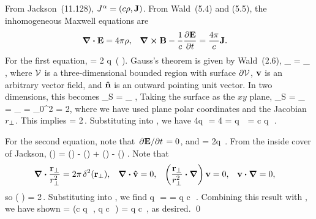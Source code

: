 \begin{solution}
	From Jackson~(11.128), $J^\alpha = (c \rho, \vb{J})$.  From Wald~(5.4) and (5.5), the inhomogeneous Maxwell equations are
	\begin{align} \label{maxwell}
		\grad \vdot \vE &= 4\pi \rho, &
		\grad \cross \vB - \frac{1}{c} \pdv{\vE}{t} &= \frac{4\pi}{c} \vJ.
	\end{align}
\clearpage
	For the first equation,
	\beq
		\grad \vdot \vE = 2 q \,\delctz \left( \grperp \vdot {} \right).
	\eeq
	Gauss's theorem is given by Wald~(2.6),
	\beq
		\int_\cV \grad \vdot \vv {} = \int_{\dcV} \vv \vdot \nh {},
	\eeq
	where $\mathcal{V}$ is a three-dimensional bounded region with surface $\partial \mathcal{V}$, $\vb{v}$ is an arbitrary vector field, and $\vb{\hat{n}}$ is an outward pointing unit vector.  In two dimensions, this becomes
	\beq
		\int_S \grperp \vdot \vv {} = \int_{\dS} \vv \vdot \nh {},
	\eeq
	Taking the surface as the $xy$ plane,
	\beq
		\int_S \grperp \vdot {}  = \int_{\dS}  \vdot \frac{\vrperp}{\rperp} 
		= \int_{\dS} 
		= \int_0^{2\pi} \frac{\rperp}{\rperp} \dd{\tht}
		= 2\pi,
	\eeq
	where we have used plane polar coordinates and the Jacobian $r_\perp$.  This implies
	\beq
		\grperp \vdot {} = 2\pi \,\delrp.
	\eeq
	Substituting into , we have
	\beqn \label{rho}
		4\pi q \,\delrp \,\delctz = 4\pi \rho
		\qimplies
		\rho = q \,\delrp \,\delctz
		\qimplies
		\Jo = c q \,\delrp \,\delctz.
	\eeqn
	
	For the second equation, note that $\pdv*{\vb{E}}{t} = 0$, and
	\beq
		\grad \cross \vB = 2q \,\delctz {}.
	\eeq
	From the inside cover of Jackson,
	\beq
		\grad \cross (\vaa \cross \vbb) = \vaa (\grad \vdot \vbb) - \vbb (\grad \vdot \vaa) + (\vbb \vdot \grad) \vaa - (\vaa \vdot \grad) \vbb.
	\eeq
	Note that
	\begin{align*}
		\grad \vdot \frac{\vrperp}{\rperp^2} &= 2\pi \,\delrp, &
		\grad \vdot \vh &= 0, &
		\left( \frac{\vrperp}{\rperp^2} \vdot \grad \right) \vv &= 0, &
		\vv \vdot \grad &= 0,
	\end{align*}
	so
	\beq
		\grad \cross \left( \vh \cross {} \right) = 2\pi \vh \,\delrp.
	\eeq
	Substituting into , we find
	\pi q \vh \,\delrp \,\delctz =  \vJ
		\qimplies
		\vJ = q c \vh \,\delrp \,\delctz.
	\eeq
	Combining this result with , we have shown
	\beq
		\Ja = (c q \,\delrp \,\delctz, q c \vh \,\delrp \,\delctz)
		= q c \valp \delrp \,\delctz,
	\eeq
	as desired. \qed
\end{solution}



